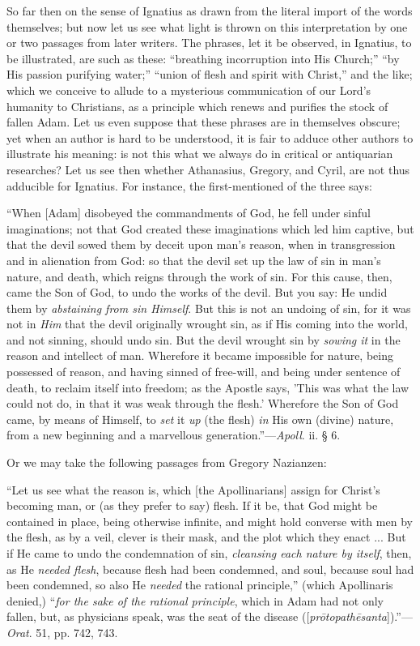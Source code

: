 So far then on the sense of Ignatius as drawn
from the literal import of the words themselves; but now let us see
what light is thrown on this interpretation by one or two passages
from later writers. The phrases, let it be observed, in Ignatius, to
be illustrated, are such as these: ``breathing incorruption into His
Church;'' ``by His passion purifying water;'' ``union of flesh and
spirit with Christ,'' and the like; which we conceive to allude to a
mysterious communication of our Lord's humanity to Christians, as a
principle which renews and purifies the stock of fallen Adam. Let us
even suppose that these phrases are in themselves obscure; yet when an
author is hard to be understood, it is fair to adduce other authors to
illustrate his meaning: is not this what we always do in critical or
antiquarian researches? Let us see then whether Athanasius, Gregory,
and Cyril, are not thus adducible for Ignatius. For instance, the
first-mentioned of the three says:

``When
[Adam] disobeyed the commandments of God, he fell under sinful
imaginations; not that God created these imaginations which led him
captive, but that the devil sowed them by deceit upon man's reason,
when in transgression and in alienation from God: so that the devil
set up the law of sin in man's nature, and death, which reigns through
the work of sin. For this cause, then, came the Son of God, to undo
the works of the devil. But you say: He undid them by \emph{abstaining
from sin Himself}. But this is not an undoing of sin, for it was
not in \emph{Him} that the devil originally wrought sin, as if His
coming into the world, and not sinning, should undo sin. But the devil
wrought sin by \emph{sowing it} in the reason and intellect of man.
Wherefore it became impossible for nature, being possessed of reason,
and having sinned of free-will, and being under sentence of death, to
reclaim itself into freedom; as the Apostle says, 'This was what the
law could not do, in that it was weak through the flesh.' Wherefore
the Son of God came, by means of Himself, to \emph{set} it \emph{up}
(the flesh) \emph{in} His own (divine) nature, from a new beginning
and a marvellous generation.''—\emph{Apoll}. ii. § 6.

Or we may take the following passages from
Gregory Nazianzen:

``Let
us see what the reason is, which [the Apollinarians] assign for Christ's
becoming man, or (as they prefer to say) flesh. If it be, that God
might be contained in place, being otherwise infinite, and
might hold converse with men by the flesh, as by a veil, clever is
their mask, and the plot which they enact ... But if He came to undo
the condemnation of sin, \emph{cleansing each nature by itself}, then,
as He \emph{needed flesh}, because flesh had been condemned, and soul,
because soul had been condemned, so also He \emph{needed} the rational
principle,'' (which Apollinaris denied,) ``\emph{for the sake of the
rational principle}, which in Adam had not only fallen, but, as
physicians speak, was the seat of the disease ([\emph{pr\={o}topath\={e}santa}]).''—\emph{Orat}.
51, pp. 742, 743.

